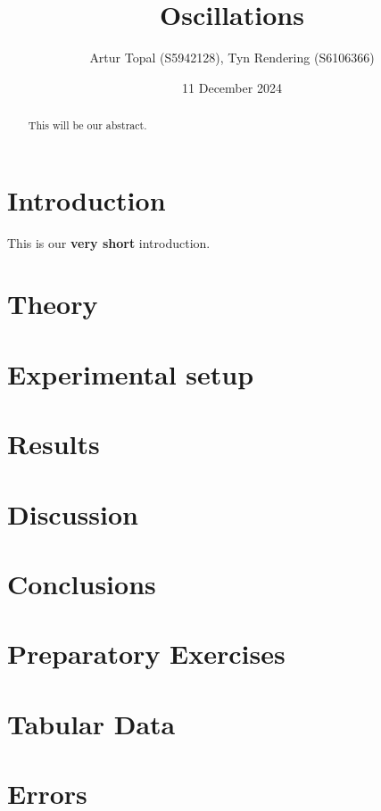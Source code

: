 \documentclass[a4paper,12pt]{article}
\title{Oscillations}
\author{Artur Topal (S5942128), Tyn Rendering (S6106366)}
\date{11 December 2024}
\begin{document}
\maketitle

\begin{abstract}
This will be our abstract.
\end{abstract}

\section{Introduction}
This is our \textbf{very short} introduction.

\section{Theory}


\section{Experimental setup}


\section{Results}


\section{Discussion}


\section{Conclusions}


\appendix
\section{Preparatory Exercises} \label{appendix:preps}

 
\section{Tabular Data} \label{appendix:data}


\section{Errors} \label{appendix:errors}

\end{document}
